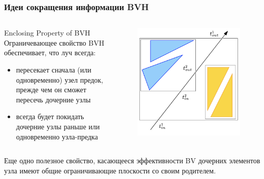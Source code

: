 \documentclass{beamer}
\begin{document}
\begin{frame}[t]
    \frametitle{Идеи сокращения информации BVH}

    \begin{columns}
        \begin{block}{Enclosing Property of BVH}
            Ограничевающее свойство BVH обеспечивает,
            что луч всегда:
            \begin{itemize}
                \item
                    пересекает сначала (или одновременно) узел предок, прежде чем он
                    сможет пересечь дочерние узлы
                \item
                    всегда будет покидать дочерние узлы
                    раньше или одновременно узла-предка
            \end{itemize}
        \end{block}

        \begin{figure}
            \includegraphics[keepaspectratio, width=\textwidth]{res/enclosing.png}
        \end{figure}
    \end{columns}

    \begin{block}{Еще одно полезное свойство, касающееся эффективности}
        BV дочерних элементов узла имеют общие ограничивающие плоскости со своим родителем.
    \end{block}

\end{frame}
\end{document}
